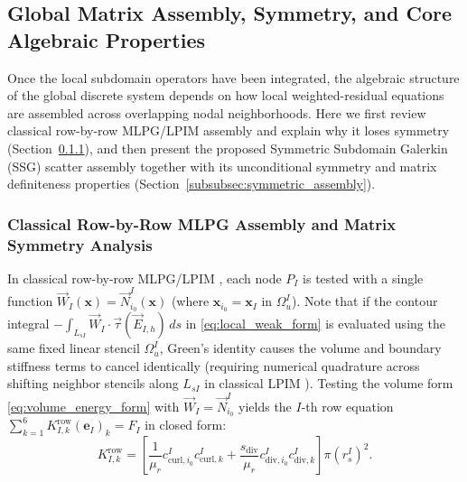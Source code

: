 \documentclass[VANCOUVER,Times1COL]{WileyNJD-v5}
\begin{document}
\subsection{Global Matrix Assembly, Symmetry, and Core Algebraic Properties}
\label{subsec:global_assembly_stability}

Once the local subdomain operators have been integrated, the algebraic structure of the global discrete system depends on how local weighted-residual equations are assembled across overlapping nodal neighborhoods. Here we first review classical row-by-row MLPG/LPIM assembly and explain why it loses symmetry (Section~\ref{subsubsec:row_mlpg_symmetry}), and then present the proposed Symmetric Subdomain Galerkin (SSG) scatter assembly together with its unconditional symmetry and matrix definiteness properties (Section~\ref{subsubsec:symmetric_assembly}).

\subsubsection{Classical Row-by-Row MLPG Assembly and Matrix Symmetry Analysis}
\label{subsubsec:row_mlpg_symmetry}

In classical row-by-row MLPG/LPIM \cite{atluri1998new, atluri2002meshless, liu2001local}, each node $P_I$ is tested with a single function $\vec{W}_I(\mathbf{x}) = \vec{N}_{i_0}^I(\mathbf{x})$ (where $\mathbf{x}_{i_0} = \mathbf{x}_I$ in $\Omega_u^I$). Note that if the contour integral $-\int_{L_{sI}} \vec{W}_I \cdot \vec{\tau}(\vec{E}_{I,h})\,ds$ in \eqref{eq:local_weak_form} is evaluated using the same fixed linear stencil $\Omega_u^I$, Green's identity causes the volume and boundary stiffness terms to cancel identically (requiring numerical quadrature across shifting neighbor stencils along $L_{sI}$ in classical LPIM \cite{liu2001local}). Testing the volume form \eqref{eq:volume_energy_form} with $\vec{W}_I = \vec{N}_{i_0}^I$ yields the $I$-th row equation $\sum_{k=1}^6 K_{I, k}^{\mathrm{row}} (\mathbf{e}_I)_k = F_I$ in closed form:
\begin{equation}
    K_{I, k}^{\mathrm{row}} = \left[ \frac{1}{\mu_r} c_{\mathrm{curl}, i_0}^I c_{\mathrm{curl}, k}^I + \frac{s_{\mathrm{div}}}{\mu_r} c_{\mathrm{div}, i_0}^I c_{\mathrm{div}, k}^I \right] \pi (r_s^I)^2.
    \label{eq:k_row_analytic}
\end{equation}
\end{document}
